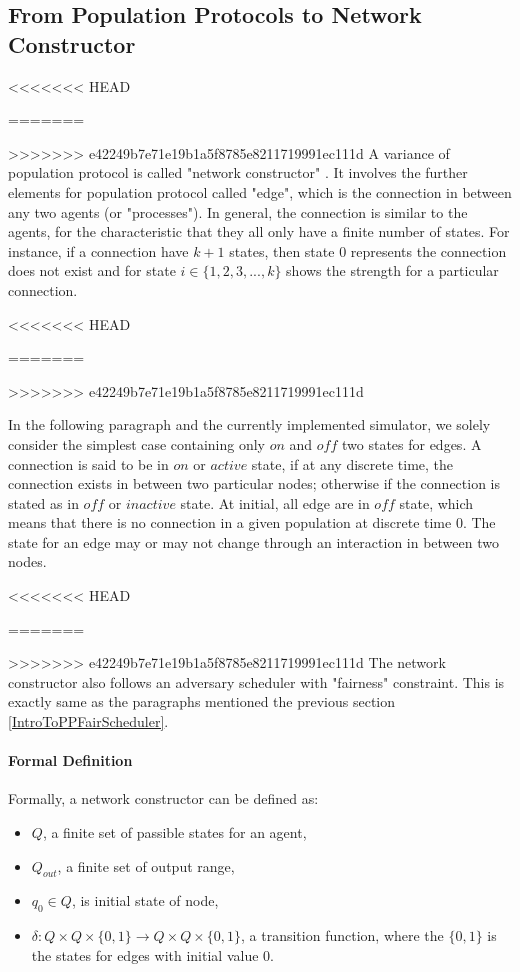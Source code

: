 \subsection{From Population Protocols to Network Constructor \cite{MS16a}}
<<<<<<< HEAD
\par\noindent
=======
\par
>>>>>>> e42249b7e71e19b1a5f8785e8211719991ec111d
A variance of population protocol is called "network constructor" \cite{MS16a}.
It involves the further elements for population protocol called "edge", which is
the connection in between any two agents (or "processes"). In general, the connection
is similar to the agents, for the characteristic that they all only have a finite number of states. For instance, if
a connection have $k + 1$ states, then state 0 represents the connection does not exist and for state $i \in \{1,2,3, ..., k\}$
shows the strength for a particular connection.


<<<<<<< HEAD
\par\noindent
=======
\par
>>>>>>> e42249b7e71e19b1a5f8785e8211719991ec111d

In the following paragraph and the currently implemented simulator, we solely consider the simplest
case containing only $on$ and $off$ two states for edges. A connection is said to be in
$on$ or $active$ state, if at any discrete time, the connection exists in between two
particular nodes; otherwise if the connection is stated as in $off$ or $inactive$ state.
At initial, all edge are in $off$ state, which means that there is no connection in a given
population at discrete time 0. The state for an edge may or may not change through an interaction
in between two nodes.

<<<<<<< HEAD
\par\noindent
=======
\par
>>>>>>> e42249b7e71e19b1a5f8785e8211719991ec111d
The network constructor also follows an adversary scheduler with "fairness" constraint. This is
exactly same as the paragraphs mentioned the previous section \ref{IntroToPPFairScheduler}.

\paragraph{Formal Definition}
Formally, a network constructor can be defined as:
\begin{itemize}
  \item $Q$, a finite set of passible states for an agent,
  \item $Q_{out}$, a finite set of output range,
  \item $q_{0} \in Q $, is initial state of node,
  \item $\delta: Q \times Q \times \{0,1\} \to Q \times Q \times \{0,1\}$, a transition function, where the $\{0,1\}$ is the states for edges with initial value 0.
\end{itemize}

